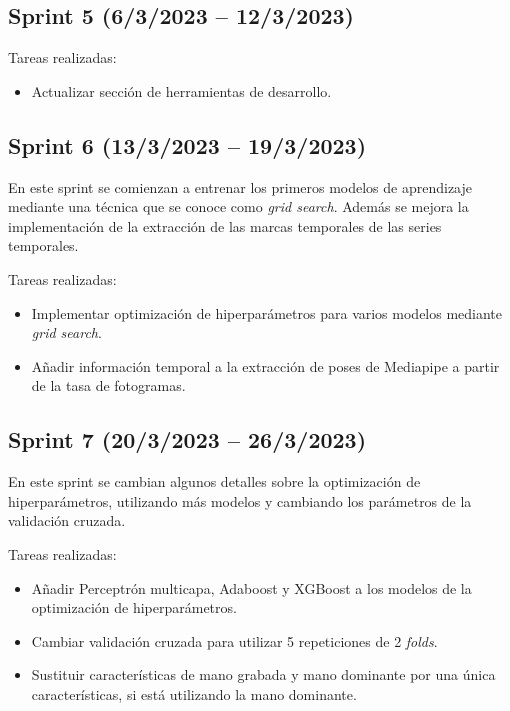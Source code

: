 \subsection{Sprint 5 (6/3/2023 -- 12/3/2023)}

Tareas realizadas:

\begin{itemize}
    \item Actualizar sección de herramientas de desarrollo.
\end{itemize}

\subsection{Sprint 6 (13/3/2023 -- 19/3/2023)}

En este sprint se comienzan a entrenar los primeros modelos de aprendizaje
mediante una técnica que se conoce como \textit{grid search}. Además se mejora
la implementación de la extracción de las marcas temporales de las series
temporales.

Tareas realizadas:

\begin{itemize}
    \item Implementar optimización de hiperparámetros para varios modelos
          mediante \textit{grid search}.
    \item Añadir información temporal a la extracción de poses de Mediapipe a
          partir de la tasa de fotogramas.
\end{itemize}

\subsection{Sprint 7 (20/3/2023 -- 26/3/2023)}

En este sprint se cambian algunos detalles sobre la optimización de
hiperparámetros, utilizando más modelos y cambiando los parámetros de la
validación cruzada.

Tareas realizadas:

\begin{itemize}
    \item Añadir Perceptrón multicapa, Adaboost y XGBoost a los modelos de la
          optimización de hiperparámetros.
    \item Cambiar validación cruzada para utilizar 5 repeticiones de 2
          \textit{folds}.
    \item Sustituir características de mano grabada y mano dominante por una
          única características, si está utilizando la mano dominante.
\end{itemize}

